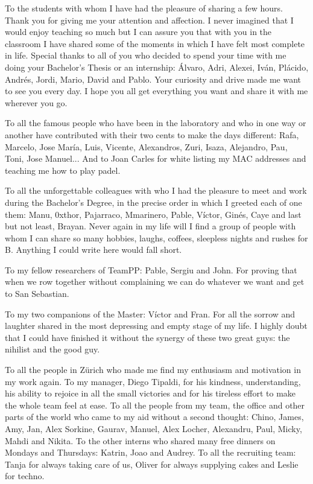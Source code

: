 To the students with whom I have had the pleasure of sharing a few hours. Thank you for giving me your attention and affection. I never imagined that I would enjoy teaching so much but I can assure you that with you in the classroom I have shared some of the moments in which I have felt most complete in life. Special thanks to all of you who decided to spend your time with me doing your Bachelor's Thesis or  an internship: Álvaro, Adri, Alexei, Iván, Plácido, Andrés, Jordi, Mario, David and Pablo. Your curiosity and drive made me want to see you every day. I hope you all get everything you want and share it with me wherever you go.

To all the famous people who have been in the laboratory and who in one way or another have contributed with their two cents to make the days different: Rafa, Marcelo, Jose María, Luis, Vicente, Alexandros, Zuri, Isaza, Alejandro, Pau, Toni, Jose Manuel... And to Joan Carles for white listing my MAC addresses and teaching me how to play padel.

To all the unforgettable colleagues with who I had the pleasure to meet and work during the Bachelor's Degree, in the precise order in which I greeted each of one them: Manu, 0xthor, Pajarraco, Mmarinero, Pable, Víctor, Ginés, Caye and last but not least, Brayan. Never again in my life will I find a group of people with whom I can share so many hobbies, laughs, coffees, sleepless nights and rushes for B. Anything I could write here would fall short.

To my fellow researchers of TeamPP: Pable, Sergiu and John. For proving that when we row together without complaining we can do whatever we want and get to San Sebastian.

To my two companions of the Master: Víctor and Fran. For all the sorrow and laughter shared in the most depressing and empty stage of my life. I highly doubt that I could have finished it without the synergy of these two great guys: the nihilist and the good guy.

To all the people in Zürich who made me find my enthusiasm and motivation in my work again. To my manager, Diego Tipaldi, for his kindness, understanding, his ability to rejoice in all the small victories and for his tireless effort to make the whole team feel at ease. To all the people from my team, the office and other parts of the world who came to my aid without a second thought: Chino, James, Amy, Jan, Alex Sorkine, Gaurav, Manuel, Alex Locher, Alexandru, Paul, Micky, Mahdi and Nikita. To the other interns who shared many free dinners on Mondays and Thursdays: Katrin, Joao and Audrey. To all the recruiting team: Tanja for always taking care of us, Oliver for always supplying cakes and Leslie for techno.

